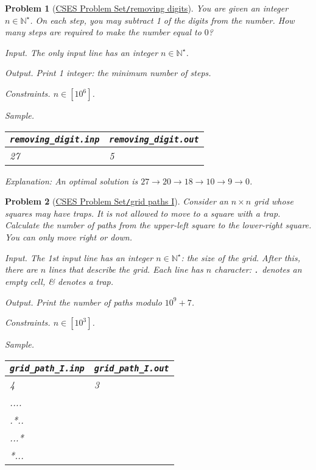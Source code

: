 \documentclass{article}
\newtheorem{problem}{Problem}
\begin{document}
\begin{problem}[\href{https://cses.fi/problemset/task/1637}{CSES Problem Set{\tt/}removing digits}]
	You are given an integer $n\in\mathbb{N}^\star$. On each step, you may subtract 1 of the digits from the number. How many steps are required to make the number equal to $0$?
	\item {\sf Input.} The only input line has an integer $n\in\mathbb{N}^\star$.
	\item {\sf Output.} Print 1 integer: the minimum number of steps.
	\item {\sf Constraints.} $n\in[10^6]$.
	\item {\sf Sample.}
	\begin{table}[H]
		\centering
		\begin{tabular}{|l|l|}
			\hline
			\verb|removing_digit.inp| & \verb|removing_digit.out| \\
			\hline
			27 & 5 \\
			\hline
		\end{tabular}
	\end{table}
	Explanation: An optimal solution is $27\to20\to18\to10\to9\to0$.
\end{problem}

\begin{problem}[\href{https://cses.fi/problemset/task/1638}{CSES Problem Set{\tt/}grid paths I}]
	Consider an $n\times n$ grid whose squares may have traps. It is not allowed to move to a square with a trap. Calculate the number of paths from the upper-left square to the lower-right square. You can only move right or down.
	\item {\sf Input.} The 1st input line has an integer $n\in\mathbb{N}^\star$: the size of the grid. After this, there are $n$ lines that describe the grid. Each line has $n$ character: {\tt.} denotes an empty cell, \& {\tt*} denotes a trap.
	\item {\sf Output.} Print the number of paths modulo $10^9 + 7$.
	\item {\sf Constraints.} $n\in[10^3]$.
	\item {\sf Sample.}
	\begin{table}[H]
		\centering
		\begin{tabular}{|l|l|}
			\hline
			\verb|grid_path_I.inp| & \verb|grid_path_I.out| \\
			\hline
			4 & 3 \\
			.... & \\
			.*.. & \\
			...* & \\
			*... & \\
			\hline
		\end{tabular}
	\end{table}
\end{problem}
\end{document}
